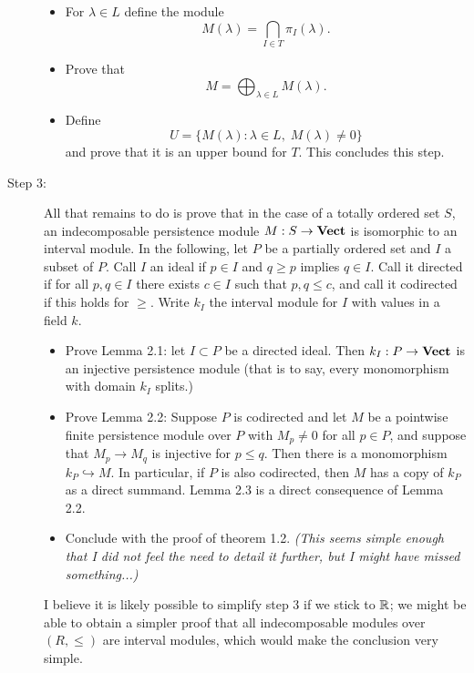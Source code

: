 \begin{description}
\begin{itemize}
\begin{center}
		 \end{center}
		 \item For $\lambda \in L$ define the module
		 \begin{equation*}
		 	M(\lambda) = \bigcap_{I \in T} \pi_I (\lambda).
		 \end{equation*}
		 \item Prove that 
		 \begin{equation*}
		 	M = \bigoplus_{\lambda \in L} M(\lambda).
		 \end{equation*}
		 \item Define 
		 \begin{equation*}
		 	U = \{ M(\lambda) \colon \lambda \in L, \; M(\lambda) \neq 0\}
		 \end{equation*}
		 and prove that it is an upper bound for $T$. This concludes this step. 
	\end{itemize}
	\item[Step 3:] All that remains to do is prove that in the case of a totally ordered set $S$, an indecomposable persistence module $M : S \rightarrow {\normalfont\textbf{Vect}}$ is isomorphic to an interval module. In the following, let $P$ be a partially ordered set and $I$ a subset of $P$. Call $I$ an ideal if $p \in I$ and $q \geq p$ implies $q \in I$. Call it directed if for all $p,q \in I$ there exists $c \in I$ such that $p,q \leq c$, and call it codirected if this holds for $\geq$. Write $k_I$ the interval module for $I$ with values in a field $k$.
	\begin{itemize}
		\item Prove Lemma 2.1: let $I \subset P$ be a directed ideal. Then $k_I : P \rightarrow {\normalfont\textbf{Vect}}$ is an injective persistence module (that is to say, every monomorphism with domain $k_I$ splits.)
		\item Prove Lemma 2.2: Suppose $P$ is codirected and let $M$ be a pointwise finite persistence module over $P$ with $M_p \neq 0$ for all $p \in P$, and suppose that 
		$M_p \rightarrow M_q$ is injective for $p \leq q$. Then there is a monomorphism $k_P \hookrightarrow M$. In particular, if $P$ is also codirected, then $M$ has a copy 
		of $k_P$ as a direct summand. Lemma 2.3 is a direct consequence of Lemma 2.2. 
		\item Conclude with the proof of theorem 1.2. \textit{(This seems simple enough that I did not feel the need to detail it further, but I might have missed something...)}
		
	\end{itemize}
	
I believe it is likely possible to simplify step 3 if we stick to $\mathbb{R}$; we might be able to obtain a simpler proof that all indecomposable modules over $(R, \leq)$ are interval modules, which would make the conclusion very simple. 
\end{description}

